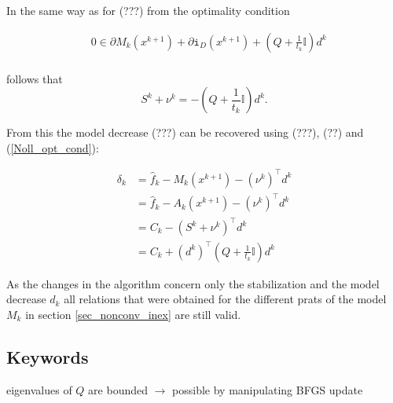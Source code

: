 In the same way as for (???) from the optimality condition

\begin{align}
	& 0 \in \partial M_k(x^{k+1})+\partial\mathtt{i}_{D}(x^{k+1})+\left(Q+\frac{1}{t_k}\mathbb{I}\right)d^k \\
	\label{Noll_opt_cond}
\end{align}

follows that 
\begin{equation}
	S^k+\nu^k = -\left(Q+\frac{1}{t_k}\mathbb{I}\right)d^k.
	\label{subgr_Q}
\end{equation}

From this the model decrease (???) can be recovered using (???), (??) and (\ref{Noll_opt_cond}):

\begin{equation}
\begin{split}
	\delta_k  &= \hat{f}_k - M_k(x^{k+1}) - (\nu^k)^{\top}d^k\\
	&= \hat{f}_k - A_k(x^{k+1}) - (\nu^k)^{\top}d^k\\
	&= C_k - (S^k+\nu^k)^{\top}d^k \\
	&= C_k + (d^k)^{\top}\left(Q+\frac{1}{t_k}\mathbb{I}\right)d^k
	\label{Noll_delta}
\end{split}
\end{equation}


As the changes in the algorithm concern only the stabilization and the model decrease \(d_k\) all relations that were obtained for the different prats of the model \(M_k\) in section \ref{sec_nonconv_inex} are still valid.










\subsection{Keywords}
eigenvalues of \(Q\) are bounded \(\to\) possible by manipulating BFGS update

